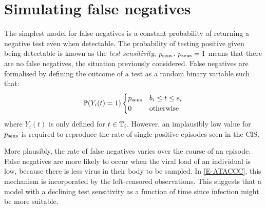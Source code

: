 \documentclass[thesis.tex]{subfiles}
\begin{document}
\section{Simulating false negatives} \label{imperf-test:sec:simulate}

The simplest model for false negatives is a constant probability of returning a negative test even when detectable.
The probability of testing positive given being detectable is known as the \emph{test sensitivity}, $p_\text{sens}$.
$p_\text{sens} = 1$ means that there are no false negatives, the situation previously considered.
False negatives are formalised by defining the outcome of a test as a random binary variable such that:
\begin{equation}
  \operatorname{\mathbb{P}}(Y_i(t) = 1) \begin{cases}
      p_\text{sens} &b_i \leq t \leq e_i \\
      0 &\text{otherwise}
  \end{cases} 
\end{equation}
where $Y_i(t)$ is only defined for $t \in \mathbb{T}_i$.
However, an implausibly low value for $p_\text{sens}$ is required to reproduce the rate of single positive episodes seen in the CIS.

More plausibly, the rate of false negatives varies over the course of an episode.
False negatives are more likely to occur when the viral load of an individual is low, because there is less virus in their body to be sampled.
In \cref{E-ATACCC}, this mechanism is incorporated by the left-censored observations.
This suggests that a model with a declining test sensitivity as a function of time since infection might be more suitable.
\end{document}

